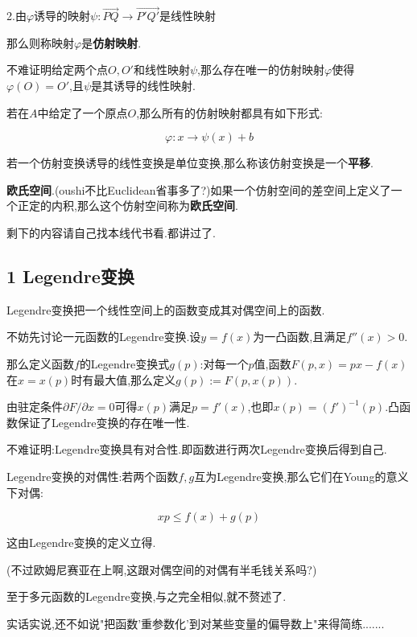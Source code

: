 \documentclass[UTF8]{article}
\begin{document}
	2.由$\varphi$诱导的映射$\psi: \overrightarrow{PQ} \rightarrow \overrightarrow{P'Q'}$是线性映射
	
	那么则称映射$\varphi$是\textbf{仿射映射}.
	
	不难证明给定两个点$O,O'$和线性映射$\psi$,那么存在唯一的仿射映射$\varphi$使得$\varphi(O)=O'$,且$\psi$是其诱导的线性映射.
	
	若在$A$中给定了一个原点$O$,那么所有的仿射映射都具有如下形式:
	
	\[\varphi: x \rightarrow \psi(x) + b\]
	
	若一个仿射变换诱导的线性变换是单位变换,那么称该仿射变换是一个\textbf{平移}.
	
	
	\textbf{欧氏空间}.(oushi不比Euclidean省事多了?)如果一个仿射空间的差空间上定义了一个正定的内积,那么这个仿射空间称为\textbf{欧氏空间}.
	
	剩下的内容请自己找本线代书看.都讲过了.
	
	\newpage
	
	
	
	
	
	
	
	
	
	
	
\subsection*{1 Legendre变换\cite{Anorld}}
	
	Legendre变换把一个线性空间上的函数变成其对偶空间上的函数.
	
	不妨先讨论一元函数的Legendre变换.设$y=f(x)$为一凸函数,且满足$f''(x)>0$.
	
	那么定义函数$f$的Legendre变换式$g(p)$:对每一个$p$值,函数$F(p,x)=px-f(x)$在$x=x(p)$时有最大值,那么定义$g(p):=F(p,x(p))$.
	
	由驻定条件$\partial F/\partial x=0$可得$x(p)$满足$p=f'(x)$,也即$x(p)=(f')^{-1}(p)$.凸函数保证了Legendre变换的存在唯一性.
	
	不难证明:Legendre变换具有对合性.即函数进行两次Legendre变换后得到自己.
	
	Legendre变换的对偶性:若两个函数$f,g$互为Legendre变换,那么它们在Young的意义下对偶:
	
	\[x p \le f(x)+g(p)\]
	
	这由Legendre变换的定义立得.
	
	(不过欧姆尼赛亚在上啊,这跟对偶空间的对偶有半毛钱关系吗?)
	
	至于多元函数的Legendre变换,与之完全相似,就不赘述了.
	
	实话实说,还不如说"把函数'重参数化'到对某些变量的偏导数上"来得简练.......
	
\end{document}
